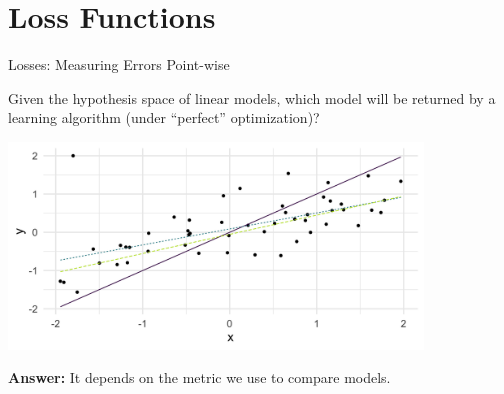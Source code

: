 \section{Loss Functions}



\begin{vbframe}{Losses: Measuring Errors Point-wise}

Given the hypothesis space of linear models, which model will be returned by a learning algorithm (under \enquote{perfect} optimization)?

\vspace*{0.2cm}

\begin{center}
\includegraphics[width = 11cm ]{figure_man/example_intro.png} \\
\end{center}


\textbf{Answer:} It depends on the metric we use to compare models.

\end{vbframe}


